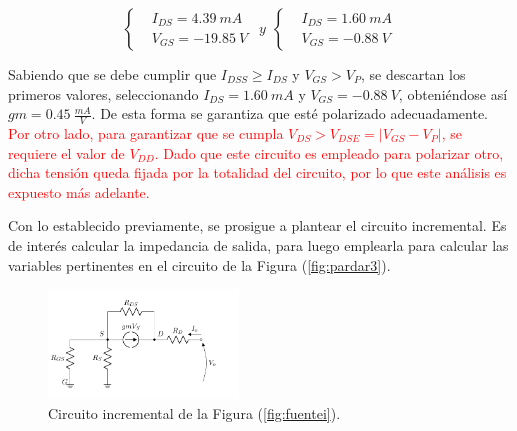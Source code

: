 
\begin{equation*}
\left\lbrace
\begin{split}
	&I_{DS} =  4.39 \ mA \\
	&V_{GS} =  -19.85 \ V
\end{split}
\right.
\ \ y \ \
\left\lbrace
\begin{split}
	&I_{DS} =  1.60 \ mA \\
	&V_{GS} =  -0.88 \ V
\end{split}
\right.
\end{equation*}

Sabiendo que se debe cumplir que $I_{DSS} \geq I_{DS}$ y $V_{GS} > V_{P}$, se descartan los primeros valores, seleccionando $I_{DS} = 1.60 \ mA$ y $V_{GS} = -0.88 \ V$, obteniéndose así $gm = 0.45 \ \frac{mA}{V}$. De esta forma se garantiza que esté polarizado adecuadamente. \textcolor{red}{Por otro lado, para garantizar que se cumpla $V_{DS} > V_{DSE} = |V_{GS} - V_P|$, se requiere el valor de $V_{DD}$. Dado que este circuito es empleado para polarizar otro, dicha tensión queda fijada por la totalidad del circuito, por lo que este análisis es expuesto más adelante.}  

Con lo establecido previamente, se prosigue a plantear el circuito incremental. Es de interés calcular la impedancia de salida, para luego emplearla para calcular las variables pertinentes en el circuito de la Figura (\ref{fig:pardar3}).
\begin{figure}[H]
\centering
	\includegraphics[width=0.45\textwidth, page=1]{Imagenes/ModeloIncremental.pdf}
	\caption{Circuito incremental de la Figura (\ref{fig:fuentei}).}
\label{fig:incfuente1}
\end{figure}

